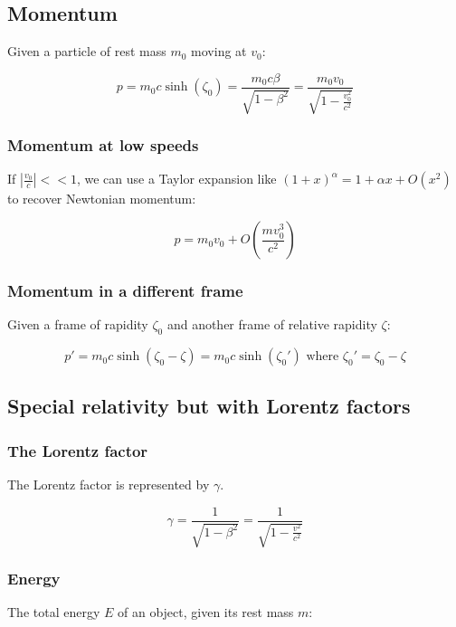 \documentclass[12pt]{article}
\begin{document}
\subsection{Momentum}

Given a particle of rest mass $m_0$ moving at $v_0$:

\[
\boxed{
p = m_0 c \sinh(\zeta_0) = \frac{m_0 c \beta}{\sqrt{1 - \beta^2}} = \frac{m_0 v_0}{\sqrt{1 - \frac{v_0^2}{c^2}}}
}
\]

\subsubsection{Momentum at low speeds}

If $\left|\frac{v_0}{c}\right| << 1$, we can use a Taylor expansion like $(1 + x)^\alpha = 1 + \alpha x + O(x^2)$ to recover Newtonian momentum:

\[
\boxed{
p = m_0v_0 + O\left(\frac{mv_0^3}{c^2}\right)
}
\]

\subsubsection{Momentum in a different frame}

Given a frame of rapidity $\zeta_0$ and another frame of relative rapidity $\zeta$:

\[
\boxed{
p' = m_0 c \sinh(\zeta_0 - \zeta) = m_0 c \sinh(\zeta_0')}\text{ where } \zeta_0' = \zeta_0 - \zeta
\]

\newpage

\subsection{Special relativity but with Lorentz factors}

\subsubsection{The Lorentz factor}

The Lorentz factor is represented by $\gamma$.

\[
\boxed{
\gamma = \frac{1}{\sqrt{1 - \beta^2}} = \frac{1}{\sqrt{1 - \frac{v^2}{c^2}}}
}
\]

\subsubsection{Energy}

The total energy $E$ of an object, given its rest mass $m$:
\end{document}
